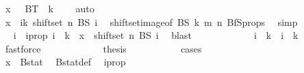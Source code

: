 \begin{isabellebody}
\ {\isachardoublequoteopen}x\ {\isasymin}\ {\isasymUnion}\ {\isacharparenleft}{\kern0pt}BT\ {\isacharbackquote}{\kern0pt}\ {\isacharbraceleft}{\kern0pt}{\isachardot}{\kern0pt}{\isachardot}{\kern0pt}k\ {\isacharplus}{\kern0pt}\ {}{\isacharbraceright}{\kern0pt}{\isacharparenright}{\kern0pt}{\isachardoublequoteclose}\ \isamarkupfalse%
\ auto\isanewline
\ \ \ \ \ \ \ \ \ \isamarkupfalse%
\isanewline
\ \ \ \ \ \ \ \isamarkupfalse%
\isanewline
\ \ \ \ \ \ \ \ \ \isamarkupfalse%
\ {}\isanewline
\ \ \ \ \ \ \ \ \ \isamarkupfalse%
\ \isamarkupfalse%
\ {\isachardoublequoteopen}x\ {\isasymin}\ {\isacharparenleft}{\kern0pt}{\isasymUnion}i{\isasymle}k{\isachardot}{\kern0pt}\ shiftset\ n\ {\isacharparenleft}{\kern0pt}BS\ i{\isacharparenright}{\kern0pt}{\isacharparenright}{\kern0pt}{\isachardoublequoteclose}\ \isamarkupfalse%
\ shiftset{\isacharunderscore}{\kern0pt}image{\isacharbrackleft}{\kern0pt}of\ BS\ k\ m\ n{\isacharbrackright}{\kern0pt}\ BfS{\isacharunderscore}{\kern0pt}props\ \isamarkupfalse%
\ simp\isanewline
\ \ \ \ \ \ \ \ \ \isamarkupfalse%
\ \isamarkupfalse%
\ i\ \ i{\isacharunderscore}{\kern0pt}prop{\isacharcolon}{\kern0pt}\ {\isachardoublequoteopen}i\ {\isasymle}\ k\ {\isasymand}\ x\ {\isasymin}\ shiftset\ n\ {\isacharparenleft}{\kern0pt}BS\ i{\isacharparenright}{\kern0pt}{\isachardoublequoteclose}\ \isamarkupfalse%
\ blast\isanewline
\ \ \ \ \ \ \ \ \ \isamarkupfalse%
\ \isamarkupfalse%
\ {\isachardoublequoteopen}i\ {\isacharequal}{\kern0pt}\ k{\isachardoublequoteclose}\ {\isacharbar}{\kern0pt}\ {\isachardoublequoteopen}i\ {\isacharless}{\kern0pt}\ k{\isachardoublequoteclose}\ \isamarkupfalse%
\ fastforce\isanewline
\ \ \ \ \ \ \ \ \ \isamarkupfalse%
\ \isamarkupfalse%
\ {\isacharquery}{\kern0pt}thesis\isanewline
\ \ \ \ \ \ \ \ \ \isamarkupfalse%
\ {\isacharparenleft}{\kern0pt}cases{\isacharparenright}{\kern0pt}\isanewline
\ \ \ \ \ \ \ \ \ \ \ \isamarkupfalse%
\ {}\isanewline
\ \ \ \ \ \ \ \ \ \ \ \isamarkupfalse%
\ \isamarkupfalse%
\ {\isachardoublequoteopen}x\ {\isasymin}\ Bstat{\isachardoublequoteclose}\ \isamarkupfalse%
\ Bstat{\isacharunderscore}{\kern0pt}def\ \isamarkupfalse%
\ i{\isacharunderscore}{\kern0pt}prop\ \isamarkupfalse%

\end{isabellebody}
